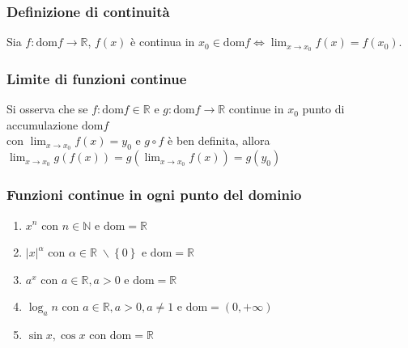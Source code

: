 \documentclass[a4paper]{article}
\newcommand\dom{\text{dom}}
\begin{document}
\subsubsection*{Definizione di continuità}
Sia \(f: \dom f \to \mathbb{R}\), \(f(x)\) è continua in \(x_0 \in \dom f \Leftrightarrow \displaystyle \lim_{x \to x_0} f(x) = f(x_0)\).

\subsubsection*{Limite di funzioni continue}
Si osserva che se \(f: \dom f \in \mathbb{R}\) e \(g: \dom f \to \mathbb{R}\) continue in \(x_0\) punto di accumulazione \(\dom f\) \\ 
con \(\displaystyle \lim_{x \to x_0} f(x) = y_0\) e \(g \circ f\) è ben definita, allora \(\displaystyle \lim_{x \to x_0} g(f(x)) = g\left( \lim_{x \to x_0} f(x) \right) = g(y_0)\)

\subsubsection*{Funzioni continue in ogni punto del dominio}
\begin{enumerate}
	\item \(x^n\) con \(n \in \mathbb{N}\) e \(\dom = \mathbb{R}\)
	\item \(\left| x \right| ^ \alpha\) con \(\alpha \in \mathbb{R} \; \backslash \left\{ 0 \right\}\) e \(\dom = \mathbb{R}\)
	\item \(a^x\) con \(a \in \mathbb{R}, a > 0\) e \(\dom = \mathbb{R}\)
	\item \(\log_a n\) con \(a \in \mathbb{R}, a > 0, a \neq 1\) e \(\dom = \left(0, + \infty \right)\)
	\item \(\sin x, \cos x\) con \(\dom = \mathbb{R}\)
\end{enumerate}
\end{document}
